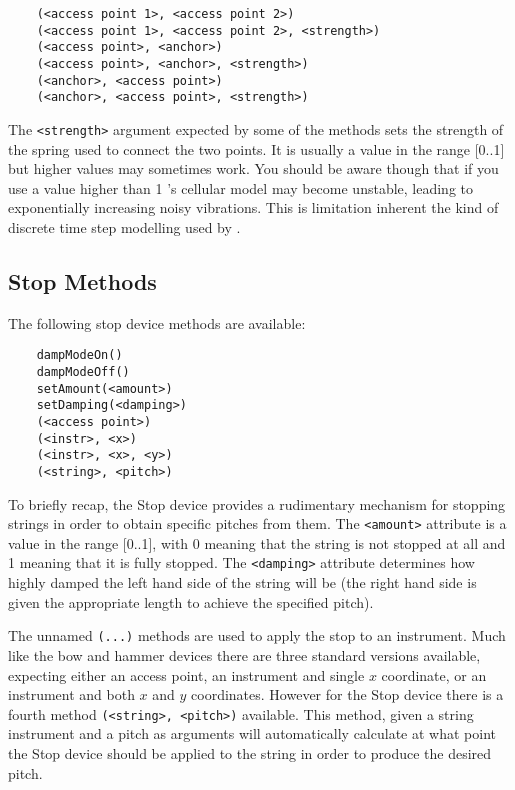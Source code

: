 \begin{verbatim}
    (<access point 1>, <access point 2>)
    (<access point 1>, <access point 2>, <strength>)
    (<access point>, <anchor>)
    (<access point>, <anchor>, <strength>)
    (<anchor>, <access point>)
    (<anchor>, <access point>, <strength>)
\end{verbatim}

The \verb|<strength>| argument expected by
some of the methods sets the strength of the spring used to connect
the two points. It is usually a value in the range [0..1] but higher
values may sometimes work. You should be aware though that if you
use a value higher than 1 \tao's cellular model may become unstable,
leading to exponentially increasing noisy vibrations. This is limitation
inherent the kind of discrete time step modelling used by \tao.

\subsection{Stop Methods}
The following stop device methods are available:

\begin{verbatim}
    dampModeOn()
    dampModeOff()
    setAmount(<amount>)
    setDamping(<damping>)
    (<access point>)
    (<instr>, <x>)
    (<instr>, <x>, <y>)
    (<string>, <pitch>)
\end{verbatim}

To briefly recap, the Stop device provides a rudimentary
mechanism for stopping strings in order to obtain specific pitches
from them. The \verb|<amount>| attribute is a value in the
range [0..1], with 0 meaning that the string is not stopped at all
and 1 meaning that it is fully stopped. The \verb|<damping>|
attribute determines how highly damped the left hand side of the string
will be (the right hand side is given the appropriate length to achieve
the specified pitch).

The unnamed \verb|(...)| methods are used to apply the stop to an
instrument. Much like the bow and hammer devices there are three standard
versions available, expecting either an access point, an instrument and
single $x$ coordinate, or an instrument and both $x$ and $y$ coordinates.
However for the Stop device there is a fourth method
\verb|(<string>, <pitch>)| available. This method, given a string
instrument and a pitch as arguments will automatically calculate at what
point the Stop device should be applied to the string in order to produce
the desired pitch.


